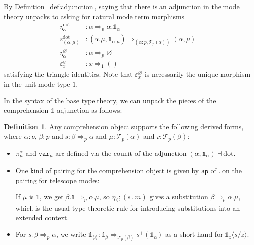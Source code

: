 \documentclass[10pt]{article}
\theoremstyle{definition}
\newtheorem{definition}{Definition}
\let\emptyset\varnothing
\newcommand\dsd[1]{\ensuremath{\mathsf{#1}}}
\newcommand{\tcell}{\Rightarrow}
\newcommand{\app}[2]{\ensuremath{#1 \: #2}}
\newcommand{\sigmacl}[3]{\ensuremath{(#1{:}#2,#3)}}
\newcommand{\fst}[1]{\app{\dsd{fst}}{#1}}
\newcommand{\snd}[1]{\app{\dsd{snd}}{#1}}
\newcommand\TermTwoT[5]{\ensuremath{#1 \vdash {#2} : #3 \tcell_{#5} #4}}
\newcommand\TrPlus[2]{\ensuremath{{#1}^+(#2)}}
\newcommand\El[2]{\mathcal{T}_{#1}(#2)}
\newcommand\ApEl[2]{\mathcal{T}_{#1}\langle#2\rangle}
\newcommand\bdot[0]{\mathbin{.}}
\newcommand\ap[2]{\ensuremath{#1 \langle #2 \rangle }}
\newcommand{\sdot}{\ensuremath{\mathrm{dot}}}
\newcommand\One{\ensuremath{\mathds{1}}}
\newcommand\var[1]{\ensuremath{\mathtt{var}_{#1}}}
\newcommand\ApOne[1]{\ensuremath{\One_{\langle {#1} \rangle }}}
\begin{document}
By Definition~\ref{def:adjunction}, saying that there is
an adjunction in the mode theory unpacks to asking for natural mode term
morphisms
\begin{align*}
\eta^\sdot_\alpha {}&: \alpha \tcell_p \alpha.\One_\alpha \\
\varepsilon^\sdot_{(\alpha, \mu)} {}&: (\alpha.\mu, \One_{\alpha.\mu}) \tcell_{\sigmacl{\alpha}{p}{\El{p}{\alpha}}} (\alpha, \mu) \\
\eta^\emptyset_\alpha {}&: \alpha \tcell_p \emptyset \\
\varepsilon^\emptyset_{x} {}&: x \tcell_1 ()
\end{align*}
satisfying the triangle identities.  Note that $\varepsilon^\emptyset_x$
is necessarily the unique morphism in the unit mode type $1$.

In the syntax of the base type theory, we can unpack the pieces of the
comprehension-$\One$ adjunction as follows:

\begin{definition}
Any comprehension object supports the following derived forms, where
$\alpha : p$, $\beta : p$ and
${s} : {\beta} \tcell_p {\alpha}$ and
$\mu : \El{p}{\alpha}$ and $\nu : \El{p}{\beta}$:
  \begin{itemize}
  \item $\pi^\alpha_\mu$ and $\var{\mu}$ are defined via the counit of the adjunction $(\alpha,\One_\alpha) \dashv \sdot$.

  \item One kind of pairing for the comprehension object is given by $\mathsf{ap}$ of
  $.$ on the pairing for telescope modes:

  If $\mu$ is $\One$, we get ${\beta.\One} \tcell_p
  {\alpha.\mu}$, so $\eta_\beta;(s \bdot m)$ gives
  a substitution ${\beta} \tcell_p {\alpha.\mu}$, which is the usual
  type theoretic rule for introducing substitutions into an extended
  context.

  \item For $s : \beta \tcell_p \alpha$, we write $\ApOne{s} :
    \One_{\beta} \tcell_{\El p \beta} \TrPlus{s}{\One_\alpha}$ as a
    short-hand for $\ap{\One_z}{s/z}$.  
  \end{itemize}
\end{definition}
\end{document}
